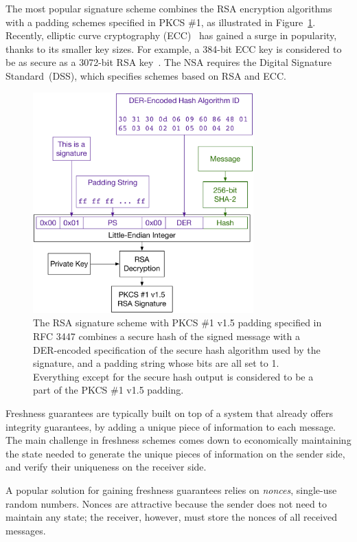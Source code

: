 The most popular signature scheme combines the RSA encryption algorithms with a
padding schemes specified in PKCS \#1, as illustrated in
Figure~\ref{fig:rsa_pkcs1_v15_padding}. Recently, elliptic curve cryptography
(ECC)~\cite{koblitz1987ecc} has gained a surge in popularity, thanks to its
smaller key sizes. For example, a 384-bit ECC key is considered to be as secure
as a 3072-bit RSA key~\cite{fips2012keysize, nsa2015suiteb}. The NSA requires
the Digital Signature Standard~(DSS)\cite{fips2013dss}, which specifies schemes
based on RSA and ECC.

\begin{figure}[hbt]
  \centering
  \includegraphics[width=85mm]{figures/rsa_pkcs1_v15_padding.pdf}
  \caption{
    The RSA signature scheme with PKCS \#1 v1.5 padding specified in RFC 3447
    combines a secure hash of the signed message with a DER-encoded
    specification of the secure hash algorithm used by the signature, and a
    padding string whose bits are all set to 1. Everything except for the
    secure hash output is considered to be a part of the PKCS \#1 v1.5 padding.
  }
  \label{fig:rsa_pkcs1_v15_padding}
\end{figure}


\label{sec:freshness_crypto}

Freshness guarantees are typically built on top of a system that already offers
integrity guarantees, by adding a unique piece of information to each message.
The main challenge in freshness schemes comes down to economically maintaining
the state needed to generate the unique pieces of information on the sender
side, and verify their uniqueness on the receiver side.

A popular solution for gaining freshness guarantees relies on \textit{nonces},
single-use random numbers. Nonces are attractive because the sender does not
need to maintain any state; the receiver, however, must store the nonces of all
received messages.

